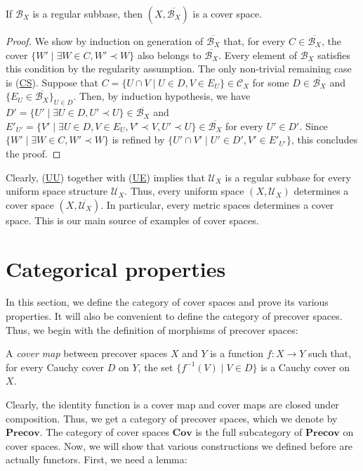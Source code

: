 \documentclass[reqno]{amsart}
\newcommand{\axref}[1]{(\hyperref[ax:#1]{#1})}
\theoremstyle{definition}
\theoremstyle{remark}
\numberwithin{figure}{section}
\newcommand{\rb}{\prec}
\newcommand{\cat}[1]{\mathbf{#1}}
\begin{document}
\begin{prop}
If $\mathcal{B}_X$ is a regular subbase, then $(X,\overline{\mathcal{B}_X})$ is a cover space.
\end{prop}
\begin{proof}
We show by induction on generation of $\overline{\mathcal{B}_X}$ that, for every $C \in \overline{\mathcal{B}_X}$, the cover $\{ W' \mid \exists W \in C, W' \rb W \}$ also belongs to $\overline{\mathcal{B}_X}$.
Every element of $\mathcal{B}_X$ satisfies this condition by the regularity assumption.
The only non-trivial remaining case is \axref{CS}.
Suppose that $C = \{ U \cap V \mid U \in D, V \in E_U \} \in \mathcal{C}_X$ for some $D \in \overline{\mathcal{B}_X}$ and $\{ E_U \in \overline{\mathcal{B}_X} \}_{U \in D}$.
Then, by induction hypothesis, we have $D' = \{ U' \mid \exists U \in D, U' \rb U \} \in \overline{\mathcal{B}_X}$ and $E'_{U'} = \{ V' \mid \exists U \in D, V \in E_U, V' \rb V, U' \rb U \} \in \overline{\mathcal{B}_X}$ for every $U' \in D'$.
Since $\{ W' \mid \exists W \in C, W' \rb W \}$ is refined by $\{ U' \cap V' \mid U' \in D', V' \in E'_{U'} \}$, this concludes the proof.
\end{proof}

Clearly, \axref{UU} together with \axref{UE} implies that $\mathcal{U}_X$ is a regular subbase for every uniform space structure $\mathcal{U}_X$.
Thus, every uniform space $(X,\mathcal{U}_X)$ determines a cover space $(X,\overline{\mathcal{U}_X})$.
In particular, every metric spaces determines a cover space.
This is our main source of examples of cover spaces.

\section{Categorical properties}

In this section, we define the category of cover spaces and prove its various properties.
It will also be convenient to define the category of precover spaces.
Thus, we begin with the definition of morphisms of precover spaces:

\begin{defn}
A \emph{cover map} between precover spaces $X$ and $Y$ is a function $f : X \to Y$ such that, for every Cauchy cover $D$ on $Y$, the set $\{ f^{-1}(V) \mid V \in D \}$ is a Cauchy cover on $X$.
\end{defn}

Clearly, the identity function is a cover map and cover maps are closed under composition.
Thus, we get a category of precover spaces, which we denote by $\cat{Precov}$.
The category of cover spaces $\cat{Cov}$ is the full subcategory of $\cat{Precov}$ on cover spaces.
Now, we will show that various constructions we defined before are actually functors.
First, we need a lemma:
\end{document}

